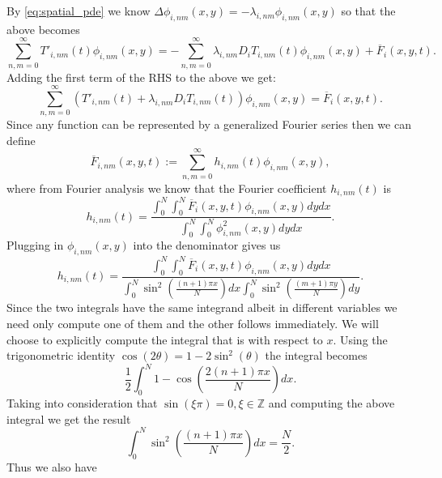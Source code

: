 \documentclass[\main/thesis.tex]{subfiles}
\begin{document}
By \eqref{eq:spatial_pde} we know $\Delta \phi_{i,nm}(x, y) {=} \minus \lambda_{i,nm} \phi_{i,nm}(x, y)$ so that the above becomes
\begin{equation*}
\sum_{n,m{=}0}^{\infty} T'_{i,nm}(t) \phi_{i,nm}(x, y) = {-}\sum_{n,m{=}0}^{\infty} \lambda_{i,nm} D_i T_{i,nm}(t) \phi_{i,nm}(x, y) {+} \overline{F}_i(x, y, t).
\end{equation*}
Adding the first term of the RHS to the above we get:
\begin{equation}
\sum_{n,m{=}0}^{\infty} \left( T'_{i,nm}(t) {+} \lambda_{i,nm} D_i T_{i,nm}(t) \right)\phi_{i,nm}(x, y) {=} \overline{F}_i(x, y, t).
\label{eq:time_source_relation}
\end{equation} 
Since any function can be represented by a generalized Fourier series then we can define
\begin{equation*}
\overline{F}_{i,nm}(x, y, t) {:=} \sum_{n,m{=}0}^{\infty} h_{i,nm}(t) \phi_{i,nm}(x, y),
\end{equation*}
where from Fourier analysis we know that the Fourier coefficient $h_{i,nm}(t)$ is
\begin{equation*}
h_{i,nm}(t) {=} \frac{\int_{0}^{N} \int_{0}^{N} \overline{F}_i(x, y, t) \phi_{i,nm}(x, y) dy dx}{\int_{0}^{N} \int_{0}^{N} \phi_{i,nm}^2(x, y) dy dx}.
\end{equation*}
Plugging in $\phi_{i,nm}(x, y)$ into the denominator gives us
\begin{equation*}
h_{i,nm}(t) {=} \frac{\int_{0}^{N} \int_{0}^{N} \overline{F}_i(x, y, t) \phi_{i,nm}(x, y) dy dx}{\int_{0}^{N} \sin^2\left( \frac{(n+1)\pi x}{N} \right) dx \int_{0}^{N} \sin^2\left( \frac{(m+1)\pi y}{N} \right) dy}.
\end{equation*}
Since the two integrals have the same integrand albeit in different variables we need only compute one of them and the other follows immediately. We will choose to explicitly compute the integral that is with respect to $x$. Using the trigonometric identity $\cos(2 \theta) {=} 1 {-} 2\sin^2(\theta)$ the integral becomes
\begin{equation*}
\frac{1}{2} \int_{0}^{N} 1 {-} \cos \left( \frac{2(n+1)\pi x}{N} \right) dx.
\end{equation*} 
Taking into consideration that $\sin(\xi \pi) {=} 0, \xi {\in} \mathbb{Z}$ and computing the above integral we get the result
\begin{equation*}
\int_{0}^{N} \sin^2\left( \frac{(n+1)\pi x}{N} \right) dx {=} \frac{N}{2}.
\end{equation*}
Thus we also have
\end{document}
